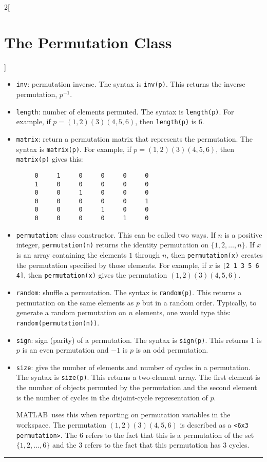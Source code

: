 \documentclass{amsart}
\newcommand\matlab{MATLAB}
\begin{document}
\begin{multicols}{2}[\section{The Permutation Class}]
\begin{itemize}
\item \verb|inv|: permutation inverse. The syntax is
  \verb|inv(p)|. This returns the inverse permutation,  $p^{-1}$. 

\item \verb|length|: number of elements permuted. The syntax is
  \verb|length(p)|. For example, if $p=(1,2)(3)(4,5,6)$, then
  \verb|length(p)| is $6$. 
  
\item \verb|matrix|: return a permutation matrix that represents the
  permutation. The syntax is \verb|matrix(p)|. For example, if
  $p=(1,2)(3)(4,5,6)$, then \verb|matrix(p)| gives this:
\begin{verbatim}
     0     1     0     0     0     0
     1     0     0     0     0     0
     0     0     1     0     0     0
     0     0     0     0     0     1
     0     0     0     1     0     0
     0     0     0     0     1     0
\end{verbatim}


\item \verb|permutation|: class constructor. This can be called two
  ways. If $n$ is a positive integer, \verb|permutation(n)| returns
  the identity permutation on $\{1,2,\ldots,n\}$. If $x$ is an array
  containing the elements $1$ through $n$, then \verb|permutation(x)|
  creates the permutation specified by those elements. For example, if
  $x$ is \verb|[2 1 3 5 6 4]|, then \verb|permutation(x)| gives the
  permutation $(1,2)(3)(4,5,6)$.

  
\item \verb|random|: shuffle a permutation. The syntax is
  \verb|random(p)|. This returns a permutation on the same elements as
  $p$ but in a random order.  Typically, to generate a random
  permutation on $n$ elements, one would type this:
  \verb|random(permutation(n))|.

\item \verb|sign|: sign (parity) of a permutation. The syntax is
  \verb|sign(p)|. This returns $1$ is $p$ is an even permutation and
  $-1$ is $p$ is an odd permutation.

\item \verb|size|: give the number of elements and number of cycles in
  a permutation. The syntax is \verb|size(p)|. This returns a
  two-element array. The first element is the number of objects
  permuted by the permutation and the second element is the number of
  cycles in the disjoint-cycle representation of $p$. 
  
  \matlab\ uses this when reporting on permutation variables in the
  workspace. The permutation $(1,2)(3)(4,5,6)$ is described as a
  \verb|<6x3 permutation>|. The $6$ refers to the fact that this is a
  permutation of the set $\{1,2,\ldots,6\}$ and the $3$ refers to the
  fact that this permutation has $3$ cycles. 
\end{itemize}

\end{multicols}\hrule
\end{document}
